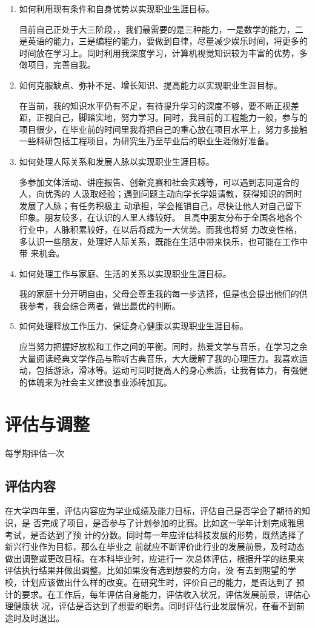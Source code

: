 \documentclass{article}
\begin{document}
\begin{enumerate}[1、]
	\item 如何利用现有条件和自身优势以实现职业生涯目标。\par
	目前自己正处于大三阶段，，我们最需要的是三种能力，一是数学的能力，二是英语的能力，三是编程的能力，要做到自律，尽量减少娱乐时间，将更多的时间放在学习上。同时利用我深度学习，计算机视觉知识较为丰富的优势，多做项目，完善自我。
	\item 如何克服缺点、弥补不足、增长知识、提高能力以实现职业生涯目标。\par
	在当前，我的知识水平仍有不足，有待提升学习的深度不够，要不断正视差距，正视自己，脚踏实地，努力学习。同时，我目前的工程能力一般，参与的项目很少，在毕业前的时间里我将把自己的重心放在项目水平上，努力多接触一些科研包括工程项目，为研究生乃至毕业后的职业生涯做好准备。
	\item 如何处理人际关系和发展人脉以实现职业生涯目标。\par
	多参加文体活动、讲座报告、创新竞赛和社会实践等，可以遇到志同道合的人，向优秀的
人汲取经验；遇到问题主动向学长学姐请教，获得知识的同时发展了人脉；有任务积极主
动承担，学会推销自己，尽快让他人对自己留下印象。朋友较多，在认识的人里人缘较好。
且高中朋友分布于全国各地各个行业中，人脉积累较好，在以后将成为一大优势。而我也将努
力改变性格，多认识一些朋友，处理好人际关系，既能在生活中带来快乐，也可能在工作中带
来机会。
	\item 如何处理工作与家庭、生活的关系以实现职业生涯目标。\par
	我的家庭十分开明自由，父母会尊重我的每一步选择，但是也会提出他们的供我参考，我会综合两者，做出最优的判断。
	\item 如何处理释放工作压力、保证身心健康以实现职业生涯目标。\par
	应当努力把握好放松和工作之间的平衡。同时，热爱文学与音乐，在学习之余大量阅读经典文学作品与聆听古典音乐，大大缓解了我的心理压力。我喜欢运动，包括游泳，滑冰等。运动可同时提高人的身心素质，让我有体力，有强健的体魄来为社会主义建设事业添砖加瓦。
\end{enumerate}
\par 


\section{评估与调整}
每学期评估一次
\subsection{评估内容}
在大学四年里，评估内容应为学业成绩及能力目标，评估自己是否学会了期待的知识，是
否完成了项目，是否参与了计划参加的比赛。比如这一学年计划完成雅思考试，是否达到了预
计的分数。同时每一年应评估科技发展的形势，既然选择了新兴行业作为目标，那么在毕业之
前就应不断评价此行业的发展前景，及时动态做出调整或更改目标。在本科毕业时，应进行一
次总体评估，根据升学的结果来评估执行结果并做出调整。比如如果没有选到想要的方向，没
有去到期望的学校，计划应该做出什么样的改变。在研究生时，评价自己的能力，是否达到了
预计的要求。在工作后，每年评估自身能力，评估收入状况，评估发展前景，评估心理健康状
况，评估是否达到了想要的职务。同时评估行业发展情况，在看不到前途时及时退出。
\end{document}
